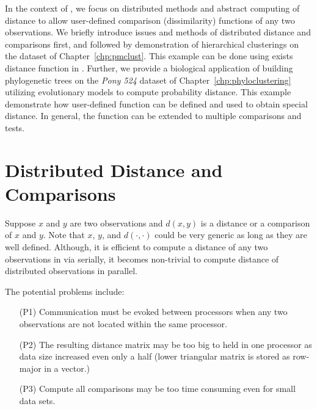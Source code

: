 In the context of \pbdR,
we focus on distributed methods and abstract
computing of distance to allow user-defined comparison (dissimilarity)
functions of any two observations.
We briefly introduce issues and methods of distributed distance and
comparisons first,
and followed by demonstration of hierarchical clusterings on the
dataset of Chapter~\ref{chp:pmclust}. This example can be done using
exists distance function in . Further, we provide a biological
application of building phylogenetic trees on the
{\it Pony 524} dataset
of Chapter~\ref{chp:phyloclustering} utilizing
evolutionary models to compute probability distance.
This example demonstrate how user-defined function can be defined and used
to obtain special distance.
In general, the function can be extended to multiple comparisons and tests.



\section{Distributed Distance and Comparisons}

Suppose $x$ and $y$ are two observations and $d(x, y)$ is a distance or
a comparison of $x$ and $y$.
Note that $x$, $y$, and $d(\cdot, \cdot)$ could be very generic as long as
they are well defined.
Although, it is efficient to compute a distance of any two observations
in  via 
serially, it becomes non-trivial to
compute distance of distributed observations in parallel.

The potential problems include:
\begin{itemize}
\item[(P1)]
      Communication must be evoked between processors when any two observations
      are not located within the same processor.
\item[(P2)]
      The resulting distance matrix may be too big
      to held in one processor as data size increased even only a half (lower
      triangular matrix is stored as row-major in a vector.)
\item[(P3)]
      Compute all comparisons may be too time consuming even for small data
      sets. 
\end{itemize}


